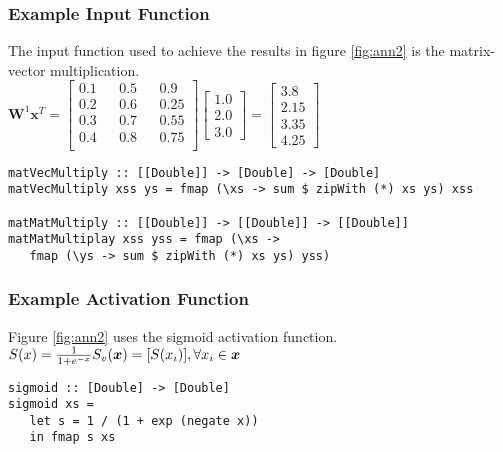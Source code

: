 \documentclass[a4paper]{article}
\begin{document}
\subsubsection{Example Input Function}
The input function used to achieve the results in figure \ref{fig:ann2} is
the matrix-vector multiplication. \\
$\boldsymbol{W}^1 \boldsymbol{x}^T = 
\begin{bmatrix}
   0.1 && 0.5 && 0.9  \\
   0.2 && 0.6 && 0.25 \\
   0.3 && 0.7 && 0.55 \\
   0.4 && 0.8 && 0.75 \\
\end{bmatrix} 
\begin{bmatrix}
   1.0 \\
   2.0 \\
   3.0 
\end{bmatrix}
= \begin{bmatrix}
   3.8 \\
   2.15 \\
   3.35 \\
   4.25
  \end{bmatrix}$
\begin{verbatim}
matVecMultiply :: [[Double]] -> [Double] -> [Double]
matVecMultiply xss ys = fmap (\xs -> sum $ zipWith (*) xs ys) xss

matMatMultiply :: [[Double]] -> [[Double]] -> [[Double]]
matMatMultiplay xss yss = fmap (\xs -> 
   fmap (\ys -> sum $ zipWith (*) xs ys) yss)
\end{verbatim}
\pagebreak
\subsubsection{Example Activation Function}
Figure \ref{fig:ann2} uses the sigmoid activation function. \\
$S(x) = \frac{1}{1 + e^{-x}} \\
 S_v(\boldsymbol{x}) = [S(x_i)], \forall x_i \in \boldsymbol{x}$
\begin{verbatim}
sigmoid :: [Double] -> [Double]
sigmoid xs = 
   let s = 1 / (1 + exp (negate x))
   in fmap s xs
\end{verbatim}
\end{document}
